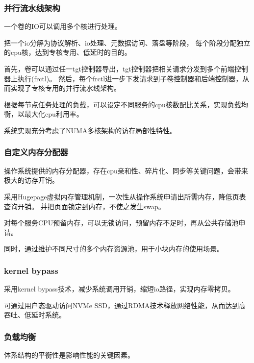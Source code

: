 \subsubsection{并行流水线架构}


一个卷的IO可以调用多个核进行处理。

把一个io分解为协议解析、io处理、元数据访问、落盘等阶段，
每个阶段分配独立的cpu核，达到专核专用、低延时的目的。

首先，卷可以通过任一tgt控制器导出，tgt控制器把相关请求分发到多个前端控制器上执行(frctl)。
然后，每个frctl进一步下发请求到子卷控制器和后端控制器，从而实现了专核专用的并行流水线架构。


根据每节点任务处理的负载，可以设定不同服务的cpu核数配比关系，实现负载均衡，以最大化cpu利用率。

系统实现充分考虑了NUMA多核架构的访存局部性特性。

\subsubsection{自定义内存分配器}

操作系统提供的内存分配器，存在cpu亲和性、碎片化、同步等关键问题，会带来极大的访存开销。

采用Hugepage虚拟内存管理机制，一次性从操作系统申请出所需内存，降低页表查询开销。
并把页面锁定到内存，不使之发生swap。

对每个服务CPU预留内存，可以无锁访问，预留内存不足时，再从公共存储池申请。

同时，通过维护不同尺寸的多个内存资源池，用于小块内存的使用场景。

\subsubsection{kernel bypass}

采用kernel bypass技术，减少系统调用开销，缩短io路径，实现内存零拷贝。

可通过用户态驱动访问NVMe SSD，通过RDMA技术释放网络性能，从而达到高吞吐、低延时系统。

\subsubsection{负载均衡}

体系结构的平衡性是影响性能的关键因素。

